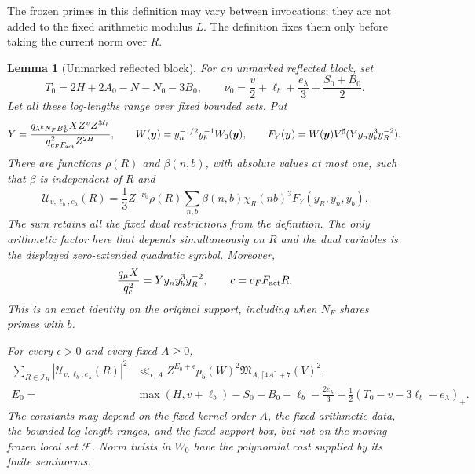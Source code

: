 \documentclass[11pt,a4paper]{article}
\numberwithin{equation}{section}
\numberwithin{figure}{section}
\newtheorem{lemma}[theorem]{Lemma}
\theoremstyle{definition}
\theoremstyle{remark}
\begin{document}
The frozen primes in this definition may vary between invocations; they are
not added to the fixed arithmetic modulus $L$.  The definition fixes them
only before taking the current norm over $R$.

\begin{lemma}[Unmarked reflected block]
\label{lem:unmarked-reflected-block}
For an unmarked reflected block, set
\[
 T_0=2H+2A_0-N-N_0-3B_0,\qquad
 \nu_0=\frac v2+\ell_b+\frac{e_\lambda}{3}+\frac{S_0+B_0}{2}.
\]
Let all these log-lengths range over fixed bounded sets.  Put
\[
 Y=\frac{q_{\lambda^kN_FB_F^3}X Z^vZ^{3\ell_b}}
          {q_{c_FF_{\rm act}}^2Z^{2H}},\qquad
 W(\boldsymbol y)=y_n^{-1/2}y_b^{-1}W_0(\boldsymbol y),\qquad
 F_Y(\boldsymbol y)=W(\boldsymbol y)V^\sharp(Yy_ny_b^3y_R^{-2}).
\]
There are functions $\rho(R)$ and $\beta(n,b)$, with absolute values at
most one, such that $\beta$ is independent of $R$ and
\begin{equation}\label{eq:unmarked-structural-block}
 \mathcal U_{v,\ell_b,e_\lambda}(R)
 =\frac13 Z^{-\nu_0}\rho(R)
       \sum_{n,b}\beta(n,b)\chi_R(nb)^3F_Y(y_R,y_n,y_b).
\end{equation}
The sum retains all the fixed dual restrictions from the definition.  The
only arithmetic factor here that depends simultaneously on $R$ and the
dual variables is the displayed zero-extended quadratic symbol.  Moreover,
\begin{equation}\label{eq:unmarked-actual-annuli}
 \frac{q_\mu X}{q_c^2}=Yy_ny_b^3y_R^{-2},\qquad
 c=c_FF_{\rm act}R.
\end{equation}
This is an exact identity on the original support, including when $N_F$
shares primes with $b$.

For every $\epsilon>0$ and every fixed $A\ge0$,
\begin{equation}\label{eq:unmarked-reflected-energy}
 \begin{split}
 \sum_{R\in\mathcal I_H}|\mathcal U_{v,\ell_b,e_\lambda}(R)|^2
 &\ll_{\epsilon,A} Z^{E_0+\epsilon}p_5(W)^2
       \mathfrak M_{A,\lceil4A\rceil+7}(V)^2,\\
 E_0={}&\max(H,v+\ell_b)-S_0-B_0-\ell_b-\frac{2e_\lambda}{3}
       -\frac12(T_0-v-3\ell_b-e_\lambda)_+.
 \end{split}
\end{equation}
The constants may depend on the fixed kernel order $A$, the fixed arithmetic
data, the bounded log-length ranges, and the fixed support box, but not on the
moving frozen local set $\mathcal F$.  Norm twists in $W_0$ have
the polynomial cost supplied by its finite seminorms.
\end{lemma}
\end{document}
